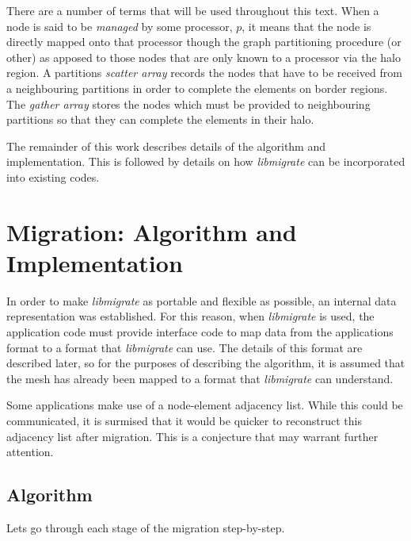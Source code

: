 \documentclass[11pt]{article}
\begin{document}
There are a number of terms that will be used throughout this
text. When a node is said to be {\it managed} by some processor, $p$,
it means that the node is directly mapped onto that processor though
the graph partitioning procedure (or other) as apposed to those nodes
that are only known to a processor via the halo region. A partitions
{\it scatter array} records the nodes that have to be received from a
neighbouring partitions in order to complete the elements on border
regions. The {\it gather array} stores the nodes which must be
provided to neighbouring partitions so that they can complete the
elements in their halo.

The remainder of this work describes details of the algorithm and
implementation. This is followed by details on how {\it libmigrate} can be
incorporated into existing codes. 

\section{Migration: Algorithm and Implementation}
In order to make {\it libmigrate} as portable and flexible as
possible, an internal data representation was established. For this
reason, when {\it libmigrate} is used, the application code must
provide interface code to map data from the applications format to a
format that {\it libmigrate} can use. The details of this format are
described later, so for the purposes of describing the algorithm, it
is assumed that the mesh has already been mapped to a format that {\it
libmigrate} can understand.

Some applications make use of a node-element adjacency list. While
this could be communicated, it is surmised that it would be quicker to
reconstruct this adjacency list after migration. This is a conjecture
that may warrant further attention.

\subsection{Algorithm}
Lets go through each stage of the migration step-by-step.
\end{document}
